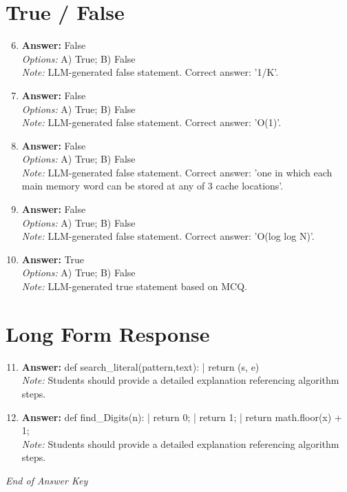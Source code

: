\documentclass[12pt]{article}
\begin{document}
\section*{True / False}
\begin{enumerate}[label=\arabic*.]
\setcounter{enumi}{5}
\item \textbf{Answer:} False
\\ \textit{Options:} A) True; B) False
\\ \textit{Note:} LLM-generated false statement. Correct answer: '1/K'.
\item \textbf{Answer:} False
\\ \textit{Options:} A) True; B) False
\\ \textit{Note:} LLM-generated false statement. Correct answer: 'O(1)'.
\item \textbf{Answer:} False
\\ \textit{Options:} A) True; B) False
\\ \textit{Note:} LLM-generated false statement. Correct answer: 'one in which each main memory word can be stored at any of 3 cache locations'.
\item \textbf{Answer:} False
\\ \textit{Options:} A) True; B) False
\\ \textit{Note:} LLM-generated false statement. Correct answer: 'O(log log N)'.
\item \textbf{Answer:} True
\\ \textit{Options:} A) True; B) False
\\ \textit{Note:} LLM-generated true statement based on MCQ.
\end{enumerate}

\section*{Long Form Response}
\begin{enumerate}[label=\arabic*.]
\setcounter{enumi}{10}
\item \textbf{Answer:} def search\_literal(pattern,text): | return (s, e)
\\ \textit{Note:} Students should provide a detailed explanation referencing algorithm steps.
\item \textbf{Answer:} def find\_Digits(n): | return 0; | return 1; | return math.floor(x) + 1;
\\ \textit{Note:} Students should provide a detailed explanation referencing algorithm steps.
\end{enumerate}

\vfill
\noindent\textit{End of Answer Key}
\end{document}
